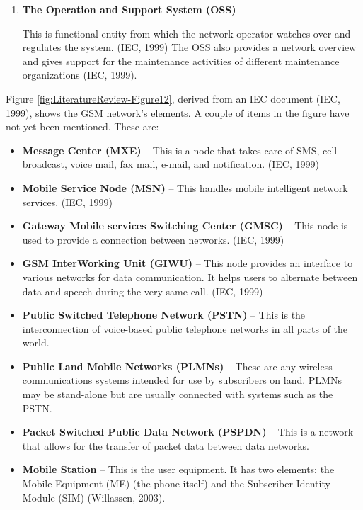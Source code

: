 \documentclass[12pt,svgnames,smaller]{article} %
\begin{document}
\begin{enumerate}
		
		\item \textbf{The Operation and Support System (OSS)}
		
		This is functional entity from which the network operator watches over and regulates the system. (IEC, 1999) The OSS also provides a network overview and gives support for the maintenance activities of different maintenance organizations (IEC, 1999).
		
		
	\end{enumerate}
	
	Figure \ref{fig:LiteratureReview-Figure12}, derived from an IEC document (IEC, 1999), shows the GSM network’s elements. A couple of items in the figure have not yet been mentioned. These are:
			
	\begin{itemize}
		\item \textbf{Message Center (MXE)} – This is a node that takes care of SMS, cell broadcast, voice mail, fax mail, e-mail, and notification. (IEC, 1999) 
		\item \textbf{Mobile Service Node (MSN)} – This handles mobile intelligent network services. (IEC, 1999)
		\item \textbf{Gateway Mobile services Switching Center (GMSC)} – This node is used to provide a connection between networks. (IEC, 1999)
		\item \textbf{GSM InterWorking Unit (GIWU)} – This node provides an interface to various networks for data communication. It helps users to alternate between data and speech during the very same call. (IEC, 1999)
		\item \textbf{Public Switched Telephone Network (PSTN)} – This is the interconnection of voice-based public telephone networks in all parts of the world.
		\item \textbf{Public Land Mobile Networks (PLMNs)} – These are any wireless communications systems intended for use by subscribers on land. PLMNs may be stand-alone but are usually connected with systems such as the PSTN.
		\item \textbf{Packet Switched Public Data Network (PSPDN)} – This is a network that allows for the transfer of packet data between data networks.
		\item \textbf{Mobile Station} – This is the user equipment. It has two elements: the Mobile Equipment (ME) (the phone itself) and the Subscriber Identity Module (SIM) (Willassen, 2003). 
	\end{itemize}
			
\end{document}

